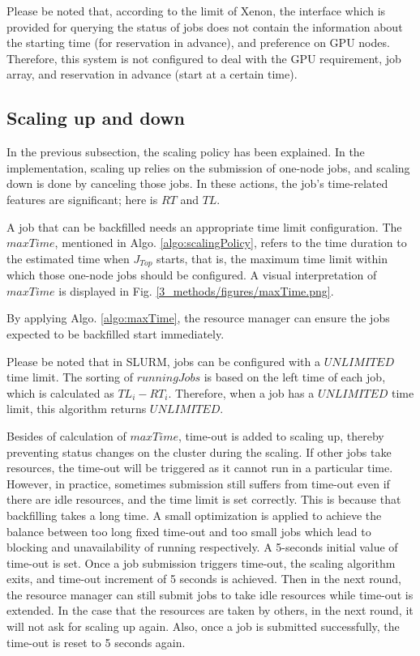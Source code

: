 Please be noted that, according to the limit of Xenon, the interface which is provided for querying the status of jobs does not contain the information about the starting time (for reservation in advance), and preference on GPU nodes.
Therefore, this system is not configured to deal with the GPU requirement, job array, and reservation in advance (start at a certain time).

\subsection{Scaling up and down}
In the previous subsection, the scaling policy has been explained.
In the implementation, scaling up relies on the submission of one-node jobs, and scaling down is done by canceling those jobs.
In these actions, the job’s time-related features are significant; here is $ RT $ and $ TL $.

A job that can be backfilled needs an appropriate time limit configuration.
The $maxTime$, mentioned in Algo. \ref{algo:scalingPolicy}, refers to the time duration to the estimated time when  $J_{Top}$ starts, that is, the maximum time limit within which those one-node jobs should be configured. 
A visual interpretation of $maxTime$ is displayed in Fig. \ref{3_methods/figures/maxTime.png}.


By applying Algo. \ref{algo:maxTime}, the resource manager can ensure the jobs expected to be backfilled start immediately.


Please be noted  that in SLURM, jobs can be configured with a $UNLIMITED$ time limit. The sorting of $runningJobs$ is based on the left time of each job, which is calculated as $TL_{i}-RT_{i}$.
Therefore, when a job has a $UNLIMITED$ time limit, this algorithm returns $UNLIMITED$.

Besides of calculation of $maxTime$, time-out is added to scaling up, thereby preventing status changes on the cluster during the scaling.
If other jobs take resources, the time-out will be triggered as it cannot run in a particular time.
However, in practice, sometimes submission still suffers from time-out even if there are idle resources, and the time limit is set correctly.
This is because that backfilling takes a long time. A small optimization is applied to achieve the balance between too long fixed time-out and too small jobs which lead to blocking and unavailability of running respectively. A 5-seconds initial value of time-out is set. 
Once a job submission triggers time-out, the scaling algorithm exits, and time-out increment of 5 seconds is achieved.
Then in the next round, the resource manager can still submit jobs to take idle resources while time-out is extended. 
In the case that the resources are taken by others, in the next round, it will not ask for scaling up again.
Also, once a job is submitted successfully, the time-out is reset to 5 seconds again.


